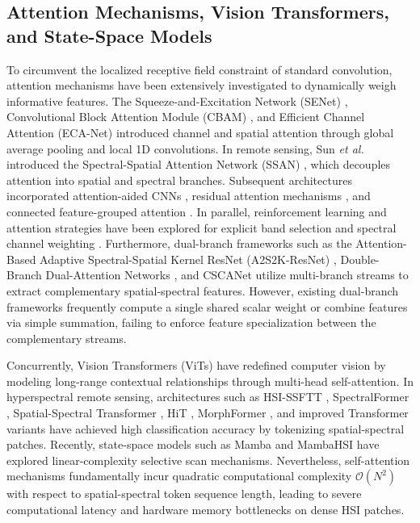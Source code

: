 \documentclass[manuscript,screen,review]{acmart}
\begin{document}
\subsection{Attention Mechanisms, Vision Transformers, and State-Space Models}
To circumvent the localized receptive field constraint of standard convolution, attention mechanisms have been extensively investigated to dynamically weigh informative features. The Squeeze-and-Excitation Network (SENet) \cite{hu2018squeeze}, Convolutional Block Attention Module (CBAM) \cite{woo2018cbam}, and Efficient Channel Attention (ECA-Net) \cite{wang2020eca} introduced channel and spatial attention through global average pooling and local 1D convolutions. In remote sensing, Sun \textit{et al.} introduced the Spectral-Spatial Attention Network (SSAN) \cite{sun2019spectral}, which decouples attention into spatial and spectral branches. Subsequent architectures incorporated attention-aided CNNs \cite{hang2021hyperspectral}, residual attention mechanisms \cite{zhu2021residual}, and connected feature-grouped attention \cite{guo2022feature}. In parallel, reinforcement learning and attention strategies have been explored for explicit band selection and spectral channel weighting \cite{mou2022deep}. Furthermore, dual-branch frameworks such as the Attention-Based Adaptive Spectral-Spatial Kernel ResNet (A2S2K-ResNet) \cite{roy2020attention}, Double-Branch Dual-Attention Networks \cite{li2020double}, and CSCANet \cite{wang2023cscanet} utilize multi-branch streams to extract complementary spatial-spectral features. However, existing dual-branch frameworks frequently compute a single shared scalar weight or combine features via simple summation, failing to enforce feature specialization between the complementary streams.

Concurrently, Vision Transformers (ViTs) \cite{dosovitskiy2020image} have redefined computer vision by modeling long-range contextual relationships through multi-head self-attention. In hyperspectral remote sensing, architectures such as HSI-SSFTT \cite{sun2022spectral}, SpectralFormer \cite{hong2021spectralformer}, Spatial-Spectral Transformer \cite{he2021spatial}, HiT \cite{yang2022hyperspectral}, MorphFormer \cite{roy2023morphformer}, and improved Transformer variants \cite{qing2021improved} have achieved high classification accuracy by tokenizing spatial-spectral patches. Recently, state-space models such as Mamba \cite{gu2023mamba} and MambaHSI \cite{li2024mambahsi} have explored linear-complexity selective scan mechanisms. Nevertheless, self-attention mechanisms fundamentally incur quadratic computational complexity $\mathcal{O}(N^2)$ with respect to spatial-spectral token sequence length, leading to severe computational latency and hardware memory bottlenecks on dense HSI patches.
\end{document}
